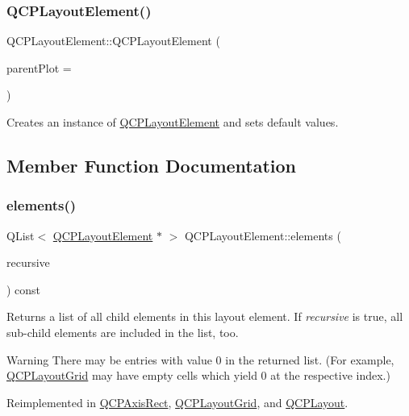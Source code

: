 \subsubsection{\texorpdfstring{Q\+C\+P\+Layout\+Element()}{QCPLayoutElement()}}
{\footnotesize\ttfamily Q\+C\+P\+Layout\+Element\+::\+Q\+C\+P\+Layout\+Element (\begin{DoxyParamCaption}\item[{\hyperlink{classQCustomPlot}{Q\+Custom\+Plot} $\ast$}]{parent\+Plot = {} }\end{DoxyParamCaption})\hspace{0.3cm}{\ttfamily [explicit]}}

Creates an instance of \hyperlink{classQCPLayoutElement}{Q\+C\+P\+Layout\+Element} and sets default values. 

\subsection{Member Function Documentation}
\mbox{\label{classQCPLayoutElement_a76dec8cb31e498994a944d7647a43309}} 
\subsubsection{\texorpdfstring{elements()}{elements()}}
{\footnotesize\ttfamily Q\+List$<$ \hyperlink{classQCPLayoutElement}{Q\+C\+P\+Layout\+Element} $\ast$ $>$ Q\+C\+P\+Layout\+Element\+::elements (\begin{DoxyParamCaption}\item[{bool}]{recursive }\end{DoxyParamCaption}) const\hspace{0.3cm}{\ttfamily [virtual]}}

Returns a list of all child elements in this layout element. If {\itshape recursive} is true, all sub-\/child elements are included in the list, too.

\begin{DoxyWarning}{Warning}
There may be entries with value 0 in the returned list. (For example, \hyperlink{classQCPLayoutGrid}{Q\+C\+P\+Layout\+Grid} may have empty cells which yield 0 at the respective index.) 
\end{DoxyWarning}


Reimplemented in \hyperlink{classQCPAxisRect_a3aee067fd105f2fa8de9eb8024435ac5}{Q\+C\+P\+Axis\+Rect}, \hyperlink{classQCPLayoutGrid_a7d5b968b4cf57393e9e387976d91f8f7}{Q\+C\+P\+Layout\+Grid}, and \hyperlink{classQCPLayout_aca129722c019f91d3367046f80abfa77}{Q\+C\+P\+Layout}.

